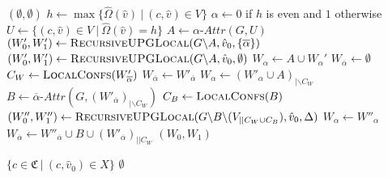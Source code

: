 \begin{algorithm}
	\caption{$\textsc{RecursiveUPGLocal}(\textit{parity game } G = (\\
		V \subseteq \mathfrak{C} \times \hat{V},\\
		\hat{V}_0 \subseteq \hat{V},\\
		\hat{V}_1 \subseteq \hat{V},\\
		E \subseteq (\mathfrak{C} \times \hat{V}) \times (\mathfrak{C} \times \hat{V}),\\
		\hat{\Omega} : \hat{V} \rightarrow \mathbb{N}),\\
		\hat{v}_0 \in \hat{V},\\
		\Delta \subseteq \{ 0,1\})$}
	\label{alg_zlnk_collective_local}
	\begin{multicols}{2}
		\begin{algorithmic}[1]
			\State \Return $(\emptyset,\emptyset)$
			\EndIf
			\State $h \gets\max\{ \hat{\Omega}(\hat{v})\ |\ (c,\hat{v}) \in V\}$
			\State $\alpha \gets 0$ if $h$ is even and $1$ otherwise
			\State $U \gets \{(c,\hat{v}) \in V\ |\ \hat{\Omega}(\hat{v}) = h\}$
			\State $A \gets \alpha\textit{-Attr}(G, U)$
			\If{$\overline{\alpha} \in \Delta$}
			\State $(W_0', W_1') \gets \textsc{RecursiveUPGLocal}(G \backslash A,\hat{v}_0,\{\overline{\alpha}\})$
			\Else
			\State $(W_0', W_1') \gets \textsc{RecursiveUPGLocal}(G \backslash A,\hat{v}_0,\emptyset)$
			\EndIf
			\label{line:recursiveUPGLocal:wopponentisempty}
			\State $W_\alpha \gets A \cup W_\alpha'$
			\State $W_{\overline{\alpha}} \gets \emptyset$
			\Else
				\State $C_W \gets \textsc{LocalConfs}(W'_{\overline{\alpha}})$\label{line:recursiveUPGLocal:calcC_W}
				\label{line:recursiveUPGLocal:wopponentwithoutCWisempty}
					\State $W_{\overline{\alpha}} \gets W'_{\overline{\alpha}}$
					\State $W_\alpha \gets (W'_\alpha \cup A)_{|\backslash C_W}$
				\Else
				\State $B \gets \overline{\alpha}\textit{-Attr}(G, (W'_{\overline{\alpha}})_{|\backslash C_W})$\label{line:recursiveUPGLocal:calcB}
				\State $C_B \gets \textsc{LocalConfs}(B)$\label{line:recursiveUPGLocal:calcC_B}
				\State $(W_0'', W_1'') \gets \textsc{RecursiveUPGLocal}(G \backslash B\backslash (V_{|| C_W \cup C_B}), \hat{v}_0, \Delta)$\label{line:recursiveUPGLocal:subgame2}
				\State $W_\alpha \gets W''_\alpha$
				\State $W_{\overline{\alpha}} \gets W''_{\overline{\alpha}} \cup B \cup (W'_{\overline{\alpha}})_{||C_W}$
				\EndIf
			\EndIf
			\State \Return $(W_0, W_1)$
		\end{algorithmic}\bigskip\bigskip\bigskip\bigskip\bigskip\bigskip\bigskip\bigskip\bigskip\bigskip\bigskip\bigskip\bigskip\bigskip\bigskip\bigskip\bigskip\bigskip\bigskip\bigskip\bigskip\bigskip\bigskip\bigskip\bigskip\bigskip
		\begin{algorithmic}[1]
			\If{$\overline{\alpha} \in \Delta$}
				\State \Return $\{ c \in \mathfrak{C}\ |\ (c, \hat{v}_0) \in X \}$
			\Else
				\State \Return $\emptyset$
			\EndIf
			\EndFunction
		\end{algorithmic}
	\end{multicols}
\end{algorithm}


